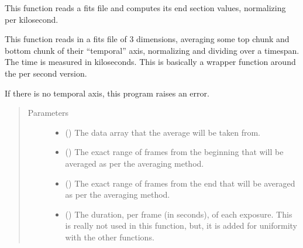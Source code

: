 \documentclass[letterpaper,10pt,english]{sphinxmanual}
\begin{document}
\begin{fulllineitems}
\label{\detokenize{docstrings/ifa_smeargle.reformat.collapse:ifa_smeargle.reformat.collapse.collapse_by_average_endpoints_per_kilosecond}}
This function reads a fits file and computes its end section
values, normalizing per kilosecond.

This function reads in a fits file of 3 dimensions, averaging
some top chunk and bottom chunk of their “temporal” axis,
normalizing and dividing over a timespan. The time is measured
in kiloseconds. This is basically a wrapper function around the
per second version.

If there is no temporal axis, this program raises an error.
\begin{quote}\begin{description}
\item[{Parameters}] \leavevmode\begin{itemize}
\item {} 
 () \textendash{} The data array that the average will be taken from.

\item {} 
 () \textendash{} The exact range of frames from the beginning that will be
averaged as per the averaging method.

\item {} 
 () \textendash{} The exact range of frames from the end that will be averaged
as per the averaging method.

\item {} 
 () \textendash{} The duration, per frame (in seconds), of each exposure.
This is really not used in this function, but, it is added
for uniformity with the other functions.


\end{itemize}
\end{description}
\end{quote}
\end{fulllineitems}
\end{document}
